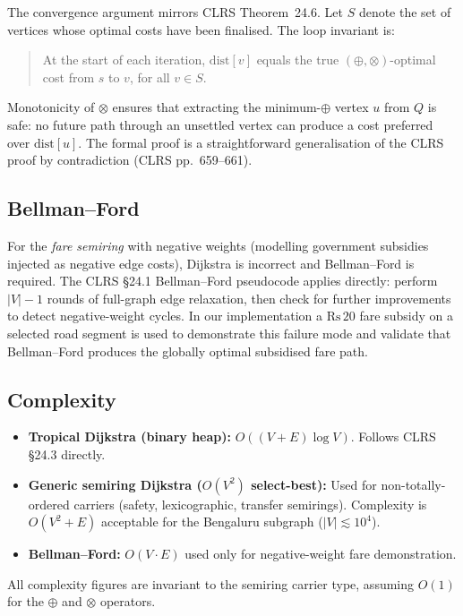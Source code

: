 \documentclass[12pt,a4paper]{article}
\newcommand{\opl}{\oplus}
\newcommand{\otm}{\otimes}
\begin{document}
The convergence argument mirrors CLRS Theorem~24.6.  Let $S$ denote the
set of vertices whose optimal costs have been finalised.  The loop invariant
is:
\begin{quote}
  At the start of each iteration, $\mathrm{dist}[v]$ equals the true
  $(\opl, \otm)$-optimal cost from $s$ to $v$, for all $v \in S$.
\end{quote}
Monotonicity of $\otm$ ensures that extracting the minimum-$\opl$ vertex
$u$ from $Q$ is safe: no future path through an unsettled vertex can produce
a cost preferred over $\mathrm{dist}[u]$.  The formal proof is a
straightforward generalisation of the CLRS proof by contradiction (CLRS
pp.~659--661).

\subsection{Bellman--Ford}

For the \emph{fare semiring} with negative weights (modelling government
subsidies injected as negative edge costs), Dijkstra is incorrect and
Bellman--Ford is required.  The CLRS §24.1 Bellman--Ford pseudocode
\cite{clrs} applies directly: perform $|V|-1$ rounds of full-graph edge
relaxation, then check for further improvements to detect negative-weight
cycles.  In our implementation a $\text{Rs}\,20$ fare subsidy on a selected
road segment is used to demonstrate this failure mode and validate that
Bellman--Ford produces the globally optimal subsidised fare path.

\subsection{Complexity}

\begin{itemize}[noitemsep]
  \item \textbf{Tropical Dijkstra (binary heap):} $O((V+E)\log V)$.
        Follows CLRS §24.3 directly.
  \item \textbf{Generic semiring Dijkstra ($O(V^2)$ select-best):}
        Used for non-totally-ordered carriers (safety, lexicographic,
        transfer semirings).  Complexity is $O(V^2 + E)$  acceptable for
        the Bengaluru subgraph ($\lvert V \rvert \lesssim 10^4$).
  \item \textbf{Bellman--Ford:} $O(V \cdot E)$  used only for
        negative-weight fare demonstration.
\end{itemize}
All complexity figures are invariant to the semiring carrier type, assuming
$O(1)$ for the $\opl$ and $\otm$ operators.
\end{document}

